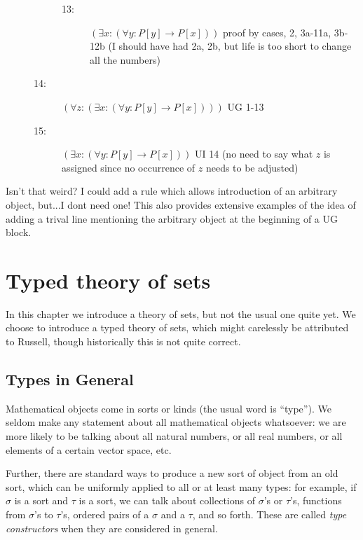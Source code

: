 \documentclass[12pt]{book}
\begin{document}
\begin{description}
\begin{description}
\begin{description}
\begin{description}
\end{description}

\item[13:]  $(\exists x:(\forall y:P[y] \rightarrow P[x]))$  proof by cases, 2, 3a-11a, 3b-12b  (I should have had 2a, 2b, but life is too short to change all the numbers)



\end{description}

\item[14:]  $(\forall z:(\exists x:(\forall y:P[y] \rightarrow P[x])))$ UG 1-13

\item[15:]  $(\exists x:(\forall y:P[y] \rightarrow P[x]))$  UI 14 (no need to say what $z$ is assigned since no occurrence of $z$ needs to be adjusted)

\end{description}

\end{description}

Isn't that weird?  I could add a rule which allows introduction of an arbitrary object, but...I dont need one!  This also provides extensive examples of the idea of adding
a trival line mentioning the arbitrary object at the beginning of a UG block.





\newpage

\chapter{Typed theory of sets}

In this chapter we introduce a theory of sets, but not the usual one
quite yet.  We choose to introduce a typed theory of sets, which might
carelessly be attributed to Russell, though historically this is not
quite correct.

\section{Types in General}

Mathematical objects come in sorts or kinds (the usual word is
``type'').  We seldom make any statement about all mathematical
objects whatsoever: we are more likely to be talking about all natural
numbers, or all real numbers, or all elements of a certain vector space, etc.

Further, there are standard ways to produce a new sort of object from an old sort, which can be uniformly applied to all or at least many types:  for example,
if $\sigma$ is a sort and $\tau$ is a sort, we can talk about collections of $\sigma$'s or $\tau$'s,  functions from $\sigma$'s to $\tau$'s, ordered pairs of a $\sigma$ and a $\tau$, and so forth.  These are called {\em type constructors\/} when they are considered in general.
\end{document}
